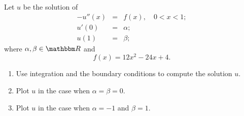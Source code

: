 Let $u$ be the solution of
\begin{eqnarray*}
 -u''(x) &=& f(x),\quad 0<x<1;
\\
 u'(0) &=& \alpha;
\\
u(1) &=& \beta;
\end{eqnarray*}
where $\alpha,\beta\in\R$ and
\[
f(x)=12x^2-24x+4.
\]
\begin{enumerate}
\item Use integration and the boundary conditions to compute the solution $u$.

\vspace*{1em}
\item Plot $u$ in the case when $\alpha=\beta=0$.

\vspace*{1em}
\item Plot $u$ in the case when $\alpha = -1$ and $\beta = 1$.

\end{enumerate}


